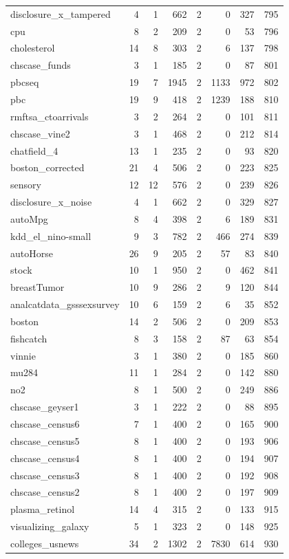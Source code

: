 \begin{tabular}{@{\hskip 0mm}l@{\hskip 0mm}rrrrrrr}
 disclosure\_x\_tampered & 4 & 1 & 662 & 2 & 0 & 327 & 795 \\
 cpu & 8 & 2 & 209 & 2 & 0 & 53 & 796 \\
 cholesterol & 14 & 8 & 303 & 2 & 6 & 137 & 798 \\
 chscase\_funds & 3 & 1 & 185 & 2 & 0 & 87 & 801 \\
 pbcseq & 19 & 7 & 1945 & 2 & 1133 & 972 & 802 \\
 pbc & 19 & 9 & 418 & 2 & 1239 & 188 & 810 \\
 rmftsa\_ctoarrivals & 3 & 2 & 264 & 2 & 0 & 101 & 811 \\
 chscase\_vine2 & 3 & 1 & 468 & 2 & 0 & 212 & 814 \\
 chatfield\_4 & 13 & 1 & 235 & 2 & 0 & 93 & 820 \\
 boston\_corrected & 21 & 4 & 506 & 2 & 0 & 223 & 825 \\
 sensory & 12 & 12 & 576 & 2 & 0 & 239 & 826 \\
 disclosure\_x\_noise & 4 & 1 & 662 & 2 & 0 & 329 & 827 \\
 autoMpg & 8 & 4 & 398 & 2 & 6 & 189 & 831 \\
 kdd\_el\_nino-small & 9 & 3 & 782 & 2 & 466 & 274 & 839 \\
 autoHorse & 26 & 9 & 205 & 2 & 57 & 83 & 840 \\
 stock & 10 & 1 & 950 & 2 & 0 & 462 & 841 \\
 breastTumor & 10 & 9 & 286 & 2 & 9 & 120 & 844 \\
 analcatdata\_gsssexsurvey & 10 & 6 & 159 & 2 & 6 & 35 & 852 \\
 boston & 14 & 2 & 506 & 2 & 0 & 209 & 853 \\
 fishcatch & 8 & 3 & 158 & 2 & 87 & 63 & 854 \\
 vinnie & 3 & 1 & 380 & 2 & 0 & 185 & 860 \\
 mu284 & 11 & 1 & 284 & 2 & 0 & 142 & 880 \\
 no2 & 8 & 1 & 500 & 2 & 0 & 249 & 886 \\
 chscase\_geyser1 & 3 & 1 & 222 & 2 & 0 & 88 & 895 \\
 chscase\_census6 & 7 & 1 & 400 & 2 & 0 & 165 & 900 \\
 chscase\_census5 & 8 & 1 & 400 & 2 & 0 & 193 & 906 \\
 chscase\_census4 & 8 & 1 & 400 & 2 & 0 & 194 & 907 \\
 chscase\_census3 & 8 & 1 & 400 & 2 & 0 & 192 & 908 \\
 chscase\_census2 & 8 & 1 & 400 & 2 & 0 & 197 & 909 \\
 plasma\_retinol & 14 & 4 & 315 & 2 & 0 & 133 & 915 \\
 visualizing\_galaxy & 5 & 1 & 323 & 2 & 0 & 148 & 925 \\
 colleges\_usnews & 34 & 2 & 1302 & 2 & 7830 & 614 & 930 \\
\bottomrule
\end{tabular}
